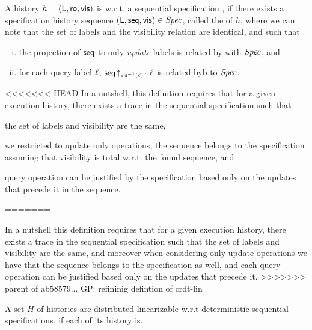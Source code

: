 \begin{definition}[\CRDTLin{}]
  \label{definition:distributed linearizability} A history $h =
  (\mathsf{L},\mathsf{ro},\mathsf{vis})$ is \CRDTLin{} w.r.t.
  a  sequential specification
  \Spec{}, if there exists a specification history sequence
  $(\mathsf{L}, \mathsf{seq}, \mathsf{vis}) \in \mathit{Spec}{}$, called the
  \crdtlinearization{} of $h$, where we can note that the set of labels
  and the visibility relation are identical, and such that %
\begin{enumerate}[(i)]
\item the projection of $\mathsf{seq}$ to only \emph{update} labels is
  related by \hwlin{} with $\mathit{Spec}$, and
\item for each query label $\ell$,
  $\mathsf{seq}\!\uparrow_{\mathsf{vis}^{-1}(\ell)}\!
  \cdot\ \ell$ is related byb \hwlin{} to $\mathit{Spec}$.
\end{enumerate}

<<<<<<< HEAD
In a nutshell, this definition requires that for a given execution
history, there exists a trace in the sequential specification such
that
\begin{inparaenum}
\item the set of labels and visibility are the same,
\item we restricted to update only operations, the sequence belongs to
  the specification assuming that visibility is total w.r.t. the found
  sequence, and
\item query operation can be justified by the specification based only
  on the updates that precede it in the sequence.
\end{inparaenum}
=======


 In a nutshell this definition requires that for a given
execution history, there exists a trace in the sequential
specification such that the set of labels and visibility are the same,
and moreover when considering only update operations we have that the
sequence belongs to the specification as well, and each query
operation can be justified based only on the updates that precede it.
>>>>>>> parent of ab58579... GP: refininig defintion of crdt-lin

A set $H$ of histories are distributed linearizable w.r.t deterministic sequential specifications, if each of its history is.
\end{definition}

